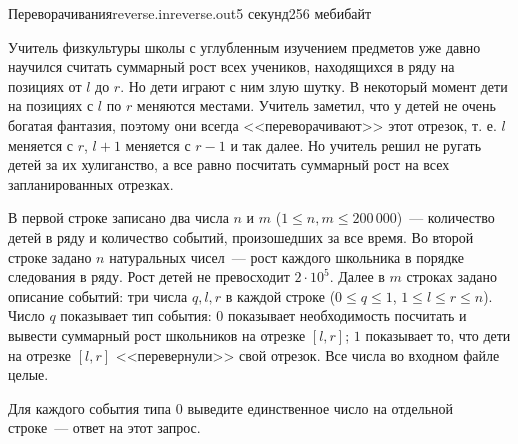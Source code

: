 \begin{problem}{Переворачивания}{reverse.in}{reverse.out}{5 секунд}{256 мебибайт}


Учитель физкультуры школы с углубленным изучением предметов уже давно научился считать
суммарный рост всех учеников, находящихся в ряду на позициях от $l$ до $r$. Но дети играют с ним
злую шутку. В некоторый момент дети на позициях с $l$ по $r$ меняются местами. Учитель заметил,
что у детей не очень богатая фантазия, поэтому они всегда <<переворачивают>> этот отрезок,
т. е. $l$ меняется с $r$, $l + 1$ меняется с $r - 1$ и так далее.
Но учитель решил не ругать детей за их хулиганство, а все равно посчитать суммарный 
рост на всех запланированных отрезках.

\InputFile

В первой строке записано два числа $n$ и $m$ ($1 \le n, m \le 200\,000$)~--- количество
детей в ряду и количество событий, произошедших за все время.
Во второй строке задано $n$ натуральных чисел~--- рост каждого школьника в порядке следования в ряду.
Рост детей не превосходит $2 \cdot 10^5$.
Далее в $m$ строках задано описание событий: три числа $q, l, r$ в каждой строке ($0 \le q \le 1$,
$1 \le l \le r \le n$). Число $q$ показывает тип события: $0$ показывает необходимость посчитать и вывести 
суммарный рост школьников на отрезке $[l, r]$; $1$ показывает то, что дети на отрезке $[l, r]$ 
<<перевернули>> свой отрезок. Все числа во входном файле целые.

\OutputFile

Для каждого события типа $0$ выведите единственное число на отдельной строке~--- ответ на этот запрос.

\Example

\begin{example}
%
\end{example}

\end{problem}
